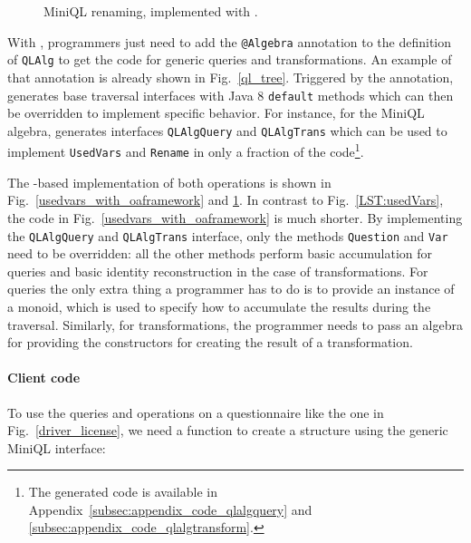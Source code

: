 \begin{figure}
\nocaptionrule
\caption{MiniQL renaming, implemented with  \Name.}
\label{rename_with_oaframework}
\end{figure}

With \Name, programmers just need to add the \lstinline{@Algebra} annotation
to the definition of \lstinline{QLAlg} to get the code for generic
queries and transformations. An example of that annotation is already
shown in Fig.~\ref{ql_tree}.
Triggered by the annotation, \name generates base traversal interfaces with Java 8 \lstinline{default} methods which can then be overridden to implement specific behavior.
For instance, for the MiniQL algebra, \name generates interfaces
\lstinline{QLAlgQuery} and
\lstinline{QLAlgTrans} which can be used to implement \lstinline{UsedVars} and \lstinline{Rename} in only a fraction of the code\footnote{The generated code is available in Appendix~\ref{subsec:appendix_code_qlalgquery} and \ref{subsec:appendix_code_qlalgtransform}.}.

The \name-based implementation of both operations is shown in
Fig.~\ref{usedvars_with_oaframework} and
\ref{rename_with_oaframework}. In contrast to Fig.~\ref{LST:usedVars}, the 
code in Fig.~\ref{usedvars_with_oaframework} is much shorter. 
By implementing the
\lstinline{QLAlgQuery} and \lstinline{QLAlgTrans} interface, only the
methods \lstinline{Question} and \lstinline{Var} need to be
overridden: all the other methods perform basic accumulation for
queries and basic identity reconstruction in the case of
transformations.  For queries the only extra thing a programmer
has to do is to provide an instance of a monoid, which is used to
specify how to accumulate the results during the traversal. Similarly,
for transformations, the programmer needs to pass an algebra for
providing the constructors for creating the result of a
transformation.

\paragraph{Client code} 
To use the queries and operations on a questionnaire like the one in Fig.~\ref{driver_license}, we need a function to create a structure using the generic MiniQL interface:


